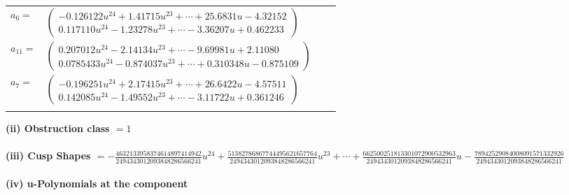 \documentclass[1p]{elsarticle_modified}
\theoremstyle{definition}
\begin{document}
\begin{tabular}{m{7pt} m{180pt} m{7pt} m{180pt} }
\flushright $a_{6}=$&$\begin{pmatrix}-0.126122 u^{24}+1.41715 u^{23}+\cdots+25.6831 u-4.32152\\0.117110 u^{24}-1.23278 u^{23}+\cdots-3.36207 u+0.462233\end{pmatrix}$ \\
\flushright $a_{11}=$&$\begin{pmatrix}0.207012 u^{24}-2.14134 u^{23}+\cdots-9.69981 u+2.11080\\0.0785433 u^{24}-0.874037 u^{23}+\cdots+0.310348 u-0.875109\end{pmatrix}$ \\
\flushright $a_{7}=$&$\begin{pmatrix}-0.196251 u^{24}+2.17415 u^{23}+\cdots+26.6422 u-4.57511\\0.142085 u^{24}-1.49552 u^{23}+\cdots-3.11722 u+0.361246\end{pmatrix}$\\&\end{tabular}
\flushleft \textbf{(ii) Obstruction class $= 1$}\\~\\
\flushleft \textbf{(iii) Cusp Shapes $= -\frac{4632133958374614897414942}{2494343012093848286566241} u^{24}+\frac{51382786867744495621657764}{2494343012093848286566241} u^{23}+\cdots+\frac{662500251813301072900532963}{2494343012093848286566241} u-\frac{78942529084008091571332926}{2494343012093848286566241}$}\\~\\
\newpage\renewcommand{\arraystretch}{1}
\flushleft \textbf{(iv) u-Polynomials at the component}\newline \\
\end{document}
